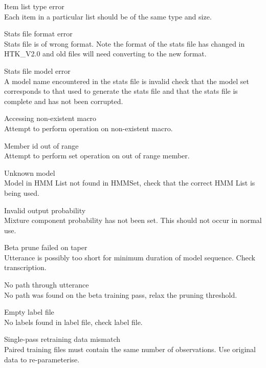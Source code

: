 \begin{itemize}
\begin{itemize}
    Item list type error\\
        Each item in a particular list should be of the same type and size.

    Stats file format error\\
        Stats file is of wrong format.  Note the format of the stats file has 
        changed in HTK\_V2.0 and old files will need converting to the new
        format.

    Stats file model error\\
        A model name encountered in the stats file is invalid check that the
        model set corresponds to that used to generate the stats file and that
        the stats file is complete and has not been corrupted.

    Accessing non-existent macro\\
        Attempt to perform operation on non-existent macro.

    Member id out of range\\
        Attempt to perform set operation on out of range member.

\end{itemize}


\begin{itemize}

    Unknown model\\
        Model in HMM List not found in HMMSet, check that the
        correct HMM List is being used.

    Invalid output probability\\
        Mixture component probability has not been set.  This should
        not occur in normal use.

    Beta prune failed on taper\\
        Utterance is possibly too short for minimum duration
        of model sequence. Check transcription.

    No path through utterance\\
        No path was found on the beta training pass, relax the
        pruning threshold.

    Empty label file\\
        No labels found in label file, check label file.

    Single-pass retraining data mismatch\\
        Paired training files must contain the same number of observations.  
        Use original data to re-parameterise.


\end{itemize}
\end{itemize}

